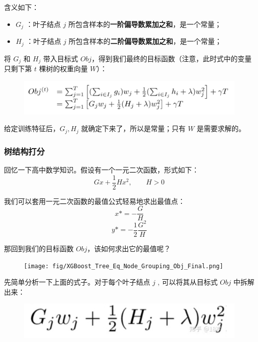 \documentclass[12pt]{article}
\begin{document}
含义如下：
\begin{itemize}
\setlength{\itemsep}{0pt}
\setlength{\parsep}{0pt}
\setlength{\parskip}{0pt}
    \item $G_j$ ：叶子结点 $j$ 所包含样本的\textbf{一阶偏导数累加之和}，是一个常量；
    \item $H_j$ ：叶子结点 $j$ 所包含样本的\textbf{二阶偏导数累加之和}，是一个常量；
\end{itemize}

将 $G_j$ 和 $H_j$ 带入目标式 $Obj$，得到我们最终的目标函数（注意，此时式中的变量只剩下第 $t$ 棵树的权重向量 $W$）：
\begin{figure}[H]
    \centering
    \includegraphics[width=.8\textwidth]{fig/XGBoost_Tree_Eq_Node_Grouping_Obj_Simplify_Final.png}
\end{figure}

\begin{framed}
给定训练特征后，$G_j, H_j$ 就确定下来了，所以是常量；只有 $W$ 是需要求解的。
\end{framed}

\subsubsection{树结构打分}
回忆一下高中数学知识。假设有一个一元二次函数，形式如下：
$$
Gx + \frac{1}{2}Hx^2, \qquad H > 0
$$

我们可以套用一元二次函数的最值公式轻易地求出最值点：
$$
x* = -\frac{G}{H}
$$
$$
y*  = -\frac{1}{2}\frac{G^2}{H}
$$

那回到我们的目标函数 $Obj$，该如何求出它的最值呢？
\begin{figure}[H]
    \centering
    \texttt{[image: fig/XGBoost\_Tree\_Eq\_Node\_Grouping\_Obj\_Final.png]}
\end{figure}

先简单分析一下上面的式子。对于每个叶子结点 $j$ , 可以将其从目标式 $Obj$ 中拆解出来：
\begin{figure}[H]
    \centering
    \includegraphics[width=.4\textwidth]{fig/XGBoost_Tree_Eq_Node_Grouping_Obj_Final_Decompose.png}
\end{figure}
\end{document}
